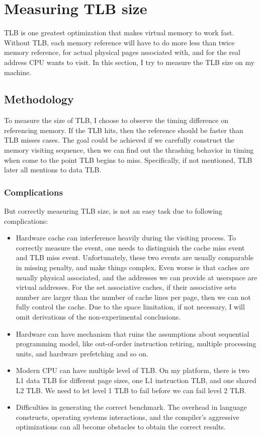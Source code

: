 \section{Measuring TLB size}
	\label{sec:tlb}
TLB is one greatest optimization that makes virtual memory to work fast.
Without TLB, each memory reference will have to do more less than twice memory
reference, for actual physical pages associated with, and for the real address
CPU wants to visit. In this section, I try to measure the TLB size on my
machine.

\subsection{Methodology}
To measure the size of TLB, I choose to observe the timing difference on referencing
memory. If the TLB hits, then the reference should be faster than TLB misses
cases. The goal could be achieved if we carefully construct the memory visiting
sequence, then we can find out the thrashing behavior in timing when come to the
point TLB begins to miss. Specifically, if not mentioned, TLB later all
mentions to data TLB.

\subsubsection{Complications}
But correctly measuring TLB size, is not an easy task due to following complications:

\begin{itemize}
\item Hardware cache can interference heavily during the visiting process. To
correctly measure the event, one needs to distinguish the cache miss event and
TLB miss event. Unfortunately, these two events are usually comparable in missing
penalty, and make things complex. Even worse is that caches are usually physical
associated, and the addresses we can provide at userspace are virtual addresses.
For the set associative caches, if their associative sets number are larger than
the number of cache lines per page, then we can not fully control the cache. Due
to the space limitation, if not necessary, I will omit derivations of the
non-experimental conclusions.
\item Hardware can have mechanism that ruins the assumptions about sequential
programming model, like out-of-order instruction retiring, multiple processing
units, and hardware prefetching and so on.
\item Modern CPU can have multiple level of TLB. On my platform, there is two
L1 data TLB for different page sizes, one L1 instruction TLB, and one shared L2
TLB. We need to let level 1 TLB to fail before we can fail level 2 TLB.
\item Difficulties in generating the correct benchmark. The overhead in
language constructs, operating systems interactions, and the compiler's
aggressive optimizations can all become obstacles to obtain the correct results.
\end{itemize}

